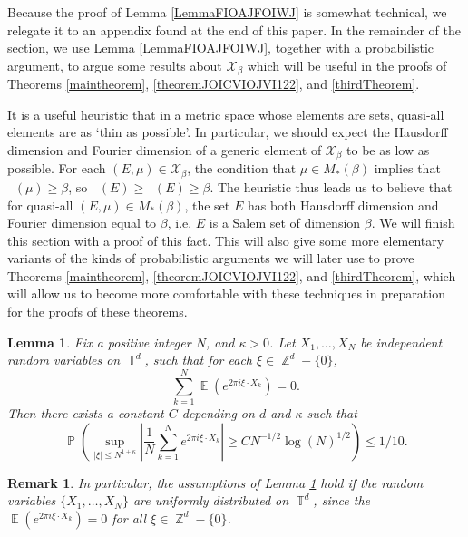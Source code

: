 \documentclass[dvipsnames,letterpaper,12pt]{article}
\numberwithin{equation}{section}
\DeclareMathOperator{\hausdim}{\dim_{\mathbb{H}}}
\DeclareMathOperator{\fordim}{\dim_{\mathbb{F}}}
\DeclareMathOperator{\ZZ}{\mathbb{Z}}
\DeclareMathOperator{\TT}{\mathbb{T}}
\newtheorem{lemma}[theorem]{Lemma}
\newtheorem{remark}[theorem]{Remark}
\numberwithin{theorem}{section}
\DeclareMathOperator{\EE}{\mathbb{E}}
\DeclareMathOperator{\PP}{\mathbb{P}}
\begin{document}
Because the proof of Lemma \ref{LemmaFIOAJFOIWJ} is somewhat technical, we relegate it to an appendix found at the end of this paper. In the remainder of the section, we use Lemma \ref{LemmaFIOAJFOIWJ}, together with a probabilistic argument, to argue some results about $\mathcal{X}_\beta$ which will be useful in the proofs of Theorems \ref{maintheorem}, \ref{theoremJOICVIOJVI122}, and \ref{thirdTheorem}.

It is a useful heuristic that in a metric space whose elements are sets, quasi-all elements are as `thin as possible'. In particular, we should expect the Hausdorff dimension and Fourier dimension of a generic element of $\mathcal{X}_\beta$ to be as low as possible. For each $(E,\mu) \in \mathcal{X}_\beta$, the condition that $\mu \in M_*(\beta)$ implies that $\fordim(\mu) \geq \beta$, so $\hausdim(E) \geq \fordim(E) \geq \beta$. The heuristic thus leads us to believe that for quasi-all $(E,\mu) \in M_*(\beta)$, the set $E$ has both Hausdorff dimension and Fourier dimension equal to $\beta$, i.e. $E$ is a Salem set of dimension $\beta$. We will finish this section with a proof of this fact. This will also give some more elementary variants of the kinds of probabilistic arguments we will later use to prove Theorems \ref{maintheorem}, \ref{theoremJOICVIOJVI122}, and \ref{thirdTheorem}, which will allow us to become more comfortable with these techniques in preparation for the proofs of these theorems.

\begin{lemma} \label{LemmaGISCICS1}
    Fix a positive integer $N$, and $\kappa > 0$. Let $X_1, \dots, X_N$ be independent random variables on $\TT^d$, such that for each $\xi \in \ZZ^d - \{ 0 \}$,
    \begin{equation} \label{equatioNVVVVSXXJVU1132}
        \sum_{k = 1}^N \EE \left( e^{2 \pi i \xi \cdot X_k} \right) = 0.
    \end{equation}
    Then there exists a constant $C$ depending on $d$ and $\kappa$ such that
    \[ \PP \left( \sup_{|\xi| \leq N^{1 + \kappa}} \left| \frac{1}{N} \sum_{k = 1}^N e^{2 \pi i \xi \cdot X_k} \right| \geq C N^{-1/2} \log(N)^{1/2} \right) \leq 1/10. \]
\end{lemma}

\begin{remark}
    In particular, the assumptions of Lemma \ref{LemmaGISCICS1} hold if the random variables $\{ X_1,\dots, X_N \}$ are uniformly distributed on $\TT^d$, since the $\EE(e^{2 \pi i \xi \cdot X_k}) = 0$ for all $\xi \in \ZZ^d - \{ 0 \}$.
\end{remark}
\end{document}
